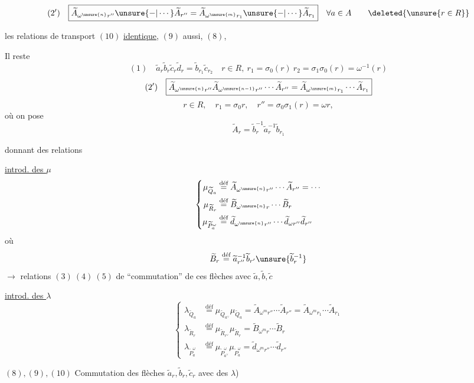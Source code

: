 \[
(2')\quad\boxed{\widetilde A_{\omega^{\unsure{n}}r''}\unsure{-|\cdots}\widetilde A_{r''}
=\widetilde A_{\omega^{\unsure{m}}r_1}\unsure{-|\cdots}\widetilde A_{r_1}}
\quad\forall a\in A\qquad\deleted{\unsure{r\in R}}
\]

les relations de transport $(10)$ \uline{identique}, $(9)$ aussi, $(8)$, 

Il reste
\[
(1)\quad\boxed{\widetilde a_r\widetilde b_r\widetilde c_r\widetilde d_r
=\widetilde b_{r_1}\widetilde c_{r_2}}
\quad r\in R,\ r_1=\sigma_0(r)\ r_2=\sigma_1\sigma_0(r)=\omega^{-1}(r)
\]
\[
(2')\quad\boxed{\widetilde A_{\omega^{\unsure{n}}r''}\widetilde A_{\omega^{\unsure{n-1}}r''}\cdots\widetilde A_{r''}
=\widetilde A_{\omega^{\unsure{m}}r_1}\cdots\widetilde A_{r_1}}
\]
\[
r\in R,\quad r_1=\sigma_0r,\quad r''=\sigma_0\sigma_1(r)=\omega r,
\]
où on pose
\[
\widetilde A_r=\widetilde b_r^{-1}\widetilde a_r^{-1}\widetilde b_{r_1}
\]

donnant des relations

\uline{introd. des $\mu$}
\[
\left\{\begin{aligned}
\mu_{\widetilde Q_a}&\overset{\text{déf}}=\widetilde A_{\omega^{\unsure{n}}r''}\cdots\widetilde A_{r''}=\cdots\\
\mu_{\widetilde R_r}&\overset{\text{déf}}=\widetilde B_{\omega^{\unsure{n}}r}\cdots\widetilde B_r\\
\mu_{\widetilde P_a^\omega}&\overset{\text{déf}}=\widetilde d_{\omega^{\unsure{n}}r''}\cdots\widetilde d_{\omega r''}\widetilde d_{r''}
\end{aligned}\right.
\]
où
\[
\widetilde B_r\overset{\text{déf}}=\widetilde a_{r''}^{-1}\widetilde b_{r'}\unsure{\widetilde b_r^{-1}}
\]
$\longrightarrow$ relations $(3)\ (4)\ (5)$ de ``commutation'' de ces flèches avec $\widetilde a,\widetilde b,\widetilde c$

\uline{introd. des $\lambda$}
\[
\left\{\begin{aligned}
\lambda_{\widetilde Q_a}&\overset{\text{déf}}=\mu_{\widetilde Q_{a^\vee}}\mu_{\widetilde Q_a}
=\widetilde A_{\omega^m r''}\cdots\widetilde A_{r''}
=\widetilde A_{\omega^m r_1}\cdots\widetilde A_{r_1}\\
\lambda_{\widetilde R_r}&\overset{\text{déf}}=\mu_{\widetilde R_{r^\vee}}\mu_{\widetilde R_r}
=\widetilde B_{\omega^m r}\cdots\widetilde B_r\\
\lambda_{\widetilde P_a^\omega}&\overset{\text{déf}}=\mu_{\widetilde P_{a^\vee}^\omega}\mu_{\widetilde P_a^\omega}
=\widetilde d_{\omega^m r''}\cdots\widetilde d_{r''}
\end{aligned}\right.
\]

\quad $(8),(9),(10)$ Commutation des flèches $\widetilde a_r,\widetilde b_r,\widetilde c_r$ avec des $\lambda$)

